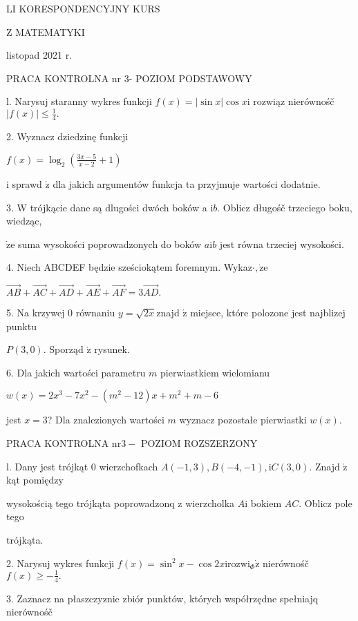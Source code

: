 \documentclass[a4paper,12pt]{article}
\begin{document}
LI KORESPONDENCYJNY KURS

Z MATEMATYKI

listopad 2021 r.

PRACA KONTROLNA nr $3$- POZIOM PODSTAWOWY

l. Narysuj staranny wykres funkcji $f(x)=|\sin x|\cos x\mathrm{i}$ rozwiąz nierównośč $|f(x)|\displaystyle \leq\frac{1}{4}.$

2. Wyznacz dziedzinę funkcji

$f(x)=\displaystyle \log_{2}(\frac{3x-5}{x-2}+1)$

$\mathrm{i}$ sprawd $\acute{\mathrm{z}}$ dla jakich argumentów funkcja ta przyjmuje wartości dodatnie.

3. $\mathrm{W}$ trójkącie dane są dlugości dwóch boków a $\mathrm{i}b$. Oblicz długośč trzeciego boku, wiedząc,

$\dot{\mathrm{z}}\mathrm{e}$ suma wysokości poprowadzonych do boków $a\mathrm{i}b$ jest równa trzeciej wysokości.

4. Niech ABCDEF będzie sześciokątem foremnym. Wykaz$\cdot, \dot{\mathrm{z}}\mathrm{e}$

$\vec{AB}+\vec{AC}+\vec{AD}+\vec{AE}+\vec{AF}=3\vec{AD}.$

5. Na krzywej $0$ równaniu $y= \sqrt{2x}$znajd $\acute{\mathrm{z}}$ miejsce, które polozone jest najblizej punktu

$P(3,0).$ Sporząd $\acute{\mathrm{z}}$ rysunek.

6. Dla jakich wartości parametru $m$ pierwiastkiem wielomianu

$w(x)=2x^{3}-7x^{2}-(m^{2}-12)x+m^{2}+m-6$

jest $x=3$? Dla znalezionych wartości $m$ wyznacz pozostałe pierwiastki $w(x).$




PRACA KONTROLNA $\mathrm{n}\mathrm{r} 3-$ POZIOM ROZSZERZONY

l. Dany jest trójkąt $0$ wierzchofkach $A(-1,3), B(-4,-1), \mathrm{i}C(3,0).$ Znajd $\acute{\mathrm{z}}$ kąt pomiędzy

wysokością tego trójkąta poprowadzonq $\mathrm{z}$ wierzcholka $A\mathrm{i}$ bokiem $AC$. Oblicz pole tego

trójkąta.

2. Narysuj wykres funkcji $f(x)=\sin^{2}x-\cos 2x\mathrm{i}\mathrm{r}\mathrm{o}\mathrm{z}\mathrm{w}\mathrm{i}_{\Phi}\dot{\mathrm{z}}$ nierównośč $f(x)\displaystyle \geq-\frac{1}{4}.$

3. Zaznacz na płaszczyz$\acute{}$nie zbiór punktów, których współrzędne spełniajq nierównośč
\end{document}
